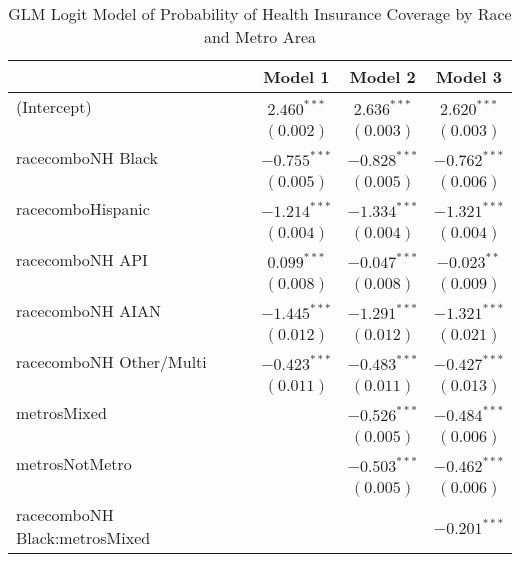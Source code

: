 \documentclass[11pt,]{article}
\begin{document}
\begin{table}
\caption{GLM Logit Model of Probability of Health Insurance Coverage by Race and Metro Area}
\begin{center}
\begin{tabular}{l c c c}
\hline
 & Model 1 & Model 2 & Model 3 \\
\hline
(Intercept)                            & $2.460^{***}$  & $2.636^{***}$  & $2.620^{***}$  \\
                                       & $(0.002)$      & $(0.003)$      & $(0.003)$      \\
racecomboNH Black                      & $-0.755^{***}$ & $-0.828^{***}$ & $-0.762^{***}$ \\
                                       & $(0.005)$      & $(0.005)$      & $(0.006)$      \\
racecomboHispanic                      & $-1.214^{***}$ & $-1.334^{***}$ & $-1.321^{***}$ \\
                                       & $(0.004)$      & $(0.004)$      & $(0.004)$      \\
racecomboNH API                        & $0.099^{***}$  & $-0.047^{***}$ & $-0.023^{**}$  \\
                                       & $(0.008)$      & $(0.008)$      & $(0.009)$      \\
racecomboNH AIAN                       & $-1.445^{***}$ & $-1.291^{***}$ & $-1.321^{***}$ \\
                                       & $(0.012)$      & $(0.012)$      & $(0.021)$      \\
racecomboNH Other/Multi                & $-0.423^{***}$ & $-0.483^{***}$ & $-0.427^{***}$ \\
                                       & $(0.011)$      & $(0.011)$      & $(0.013)$      \\
metrosMixed                            &                & $-0.526^{***}$ & $-0.484^{***}$ \\
                                       &                & $(0.005)$      & $(0.006)$      \\
metrosNotMetro                         &                & $-0.503^{***}$ & $-0.462^{***}$ \\
                                       &                & $(0.005)$      & $(0.006)$      \\
racecomboNH Black:metrosMixed          &                &                & $-0.201^{***}$ \\

\end{tabular}
\end{center}
\end{table}
\end{document}
